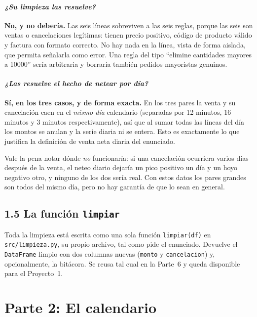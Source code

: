 \documentclass[11pt]{article}
\begin{document}
\paragraph{{\normalfont\itshape ¿Su limpieza las resuelve?}} \textbf{No, y
no deber\'ia.} Las seis l\'ineas sobreviven a las seis reglas, porque las
seis son ventas o cancelaciones leg\'itimas: tienen precio positivo,
c\'odigo de producto v\'alido y factura con formato correcto. No hay nada en
la l\'inea, vista de forma aislada, que permita se\~nalarla como error. Una
regla del tipo ``elimine cantidades mayores a \num{10000}'' ser\'ia
arbitraria y borrar\'ia tambi\'en pedidos mayoristas genuinos.

\paragraph{{\normalfont\itshape ¿Las resuelve el hecho de netear por
d\'ia?}} \textbf{S\'i, en los tres casos, y de forma exacta.} En los tres
pares la venta y su cancelaci\'on caen en el \emph{mismo d\'ia} calendario
(separadas por 12 minutos, 16 minutos y 3 minutos respectivamente), as\'i que
al sumar todas las l\'ineas del d\'ia los montos se anulan y la serie diaria
ni se entera. Esto es exactamente lo que justifica la definici\'on de venta
neta diaria del enunciado.

Vale la pena notar d\'onde \emph{no} funcionar\'ia: si una cancelaci\'on
ocurriera varios d\'ias despu\'es de la venta, el neteo diario dejar\'ia un
pico positivo un d\'ia y un hoyo negativo otro, y ninguno de los dos
ser\'ia real. Con estos datos los pares grandes son todos del mismo d\'ia,
pero no hay garant\'ia de que lo sean en general.

\subsection{1.5 La funci\'on \texttt{limpiar}}

Toda la limpieza est\'a escrita como una sola funci\'on
\texttt{limpiar(df)} en \texttt{src/limpieza.py}, su propio archivo, tal
como pide el enunciado. Devuelve el \texttt{DataFrame} limpio con dos
columnas nuevas (\texttt{monto} y \texttt{cancelacion}) y, opcionalmente, la
bit\'acora. Se reusa tal cual en la Parte~6 y queda disponible para el
Proyecto~1.

\section{Parte 2: El calendario}
\end{document}
